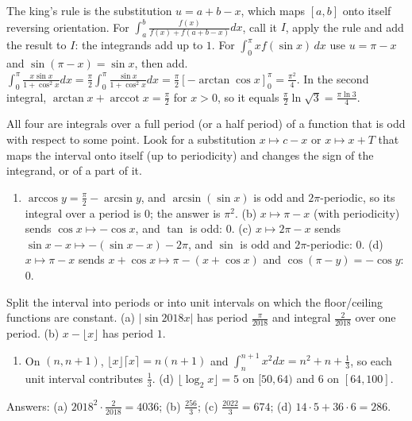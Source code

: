 \documentclass[11pt,a4paper]{article}
\begin{document}

The king's rule is the substitution \(u=a+b-x\), which maps \([a,b]\) onto itself reversing orientation. For \(\int_a^b\frac{f(x)}{f(x)+f(a+b-x)}dx\), call it \(I\), apply the rule and add the result to \(I\): the integrands add up to \(1\). For \(\int_0^\pi xf(\sin x)\,dx\) use \(u=\pi-x\) and \(\sin(\pi-x)=\sin x\), then add.
\(\int_0^\pi\frac{x\sin x}{1+\cos^2x}dx=\frac\pi2\int_0^\pi\frac{\sin x}{1+\cos^2x}dx=\frac\pi2\left[-\arctan\cos x\right]_0^\pi=\frac{\pi^2}4\). In the second integral, \(\arctan x+\operatorname{arccot}x=\frac\pi2\) for \(x\gt 0\), so it equals \(\frac\pi2\ln\sqrt3=\frac{\pi\ln3}4\).

All four are integrals over a full period (or a half period) of a function that is odd with respect to some point. Look for a substitution \(x\mapsto c-x\) or \(x\mapsto x+T\) that maps the interval onto itself (up to periodicity) and changes the sign of the integrand, or of a part of it.
\begin{enumerate}
\def\labelenumi{(\alph{enumi})}
\tightlist
\item
  \(\arccos y=\frac\pi2-\arcsin y\), and \(\arcsin(\sin x)\) is odd and \(2\pi\)-periodic, so its integral over a period is \(0\); the answer is \(\pi^2\). (b) \(x\mapsto\pi-x\) (with periodicity) sends \(\cos x\mapsto-\cos x\), and \(\tan\) is odd: \(0\). (c) \(x\mapsto 2\pi-x\) sends \(\sin x-x\mapsto -(\sin x-x)-2\pi\), and \(\sin\) is odd and \(2\pi\)-periodic: \(0\). (d) \(x\mapsto\pi-x\) sends \(x+\cos x\mapsto\pi-(x+\cos x)\) and \(\cos(\pi-y)=-\cos y\): \(0\).
\end{enumerate}

Split the interval into periods or into unit intervals on which the floor/ceiling functions are constant. (a) \(\lvert\sin 2018x\rvert\) has period \(\frac{\pi}{2018}\) and integral \(\frac2{2018}\) over one period. (b) \(x-\lfloor x\rfloor\) has period \(1\).
\begin{enumerate}
\def\labelenumi{(\alph{enumi})}
\setcounter{enumi}{2}
\tightlist
\item
  On \((n,n+1)\), \(\lfloor x\rfloor\lceil x\rceil=n(n+1)\) and \(\int_n^{n+1}x^2dx=n^2+n+\frac13\), so each unit interval contributes \(\frac13\). (d) \(\lfloor\log_2x\rfloor=5\) on \([50,64)\) and \(6\) on \([64,100]\).
\end{enumerate}
Answers: (a) \(2018^2\cdot\frac2{2018}=4036\); (b) \(\frac{256}3\); (c) \(\frac{2022}3=674\); (d) \(14\cdot5+36\cdot6=286\).
\end{document}
